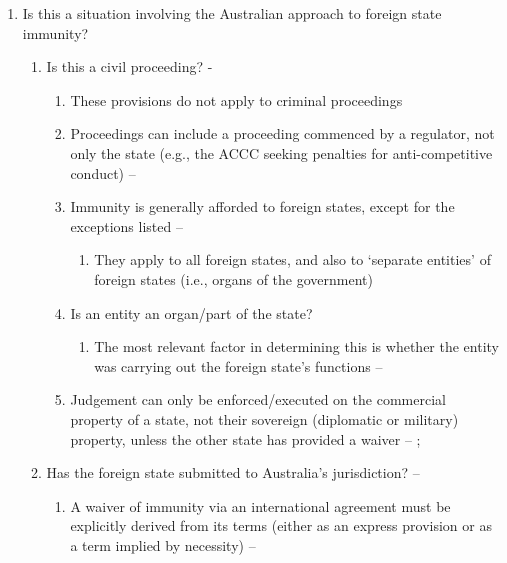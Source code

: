 \begin{enumerate}
    \item Is this a situation involving the Australian approach to foreign state immunity?
    \begin{enumerate}
        \item Is this a civil proceeding? - 
        \begin{enumerate}
            \item These provisions do not apply to criminal proceedings
            \item Proceedings can include a proceeding commenced by a regulator, not only the state (e.g., the ACCC seeking penalties for anti-competitive conduct) -- 
            \item Immunity is generally afforded to foreign states, except for the exceptions listed -- 
            \begin{enumerate}
                \item They apply to all foreign states, and also to `separate entities' of foreign states (i.e., organs of the government)
            \end{enumerate}
            \item Is an entity an organ/part of the state?
            \begin{enumerate}
                \item The most relevant factor in determining this is whether the entity was carrying out the foreign state's functions -- 
            \end{enumerate}
            \item Judgement can only be enforced/executed on the commercial property of a state, not their sovereign (diplomatic or military) property, unless the other state has provided a waiver -- ; 
        \end{enumerate}
        \item Has the foreign state submitted to Australia's jurisdiction? -- 
        \begin{enumerate}
            \item A waiver of immunity via an international agreement must be explicitly derived from its terms (either as an express provision or as a term implied by necessity) -- 

\end{enumerate}
\end{enumerate}
\end{enumerate}
